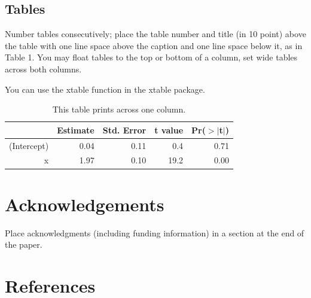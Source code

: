 \documentclass[10pt, letterpaper]{article}
\begin{document}
\hypertarget{tables}{%
\subsection{Tables}\label{tables}}

Number tables consecutively; place the table number and title (in 10
point) above the table with one line space above the caption and one
line space below it, as in Table 1. You may float tables to the top or
bottom of a column, set wide tables across both columns.

You can use the xtable function in the xtable package.

\begin{table}[H]
\centering
\begin{tabular}{rrrrr}
  \hline
 & Estimate & Std. Error & t value & Pr($>$$|$t$|$) \\ 
  \hline
(Intercept) & 0.04 & 0.11 & 0.4 & 0.71 \\ 
  x & 1.97 & 0.10 & 19.2 & 0.00 \\ 
   \hline
\end{tabular}
\caption{This table prints across one column.} 
\end{table}

\hypertarget{acknowledgements}{%
\section{Acknowledgements}\label{acknowledgements}}

Place acknowledgments (including funding information) in a section at
the end of the paper.

\hypertarget{references}{%
\section{References}\label{references}}

\setlength{\parindent}{-0.1in} 
\setlength{\leftskip}{0.125in}

\noindent
\end{document}
